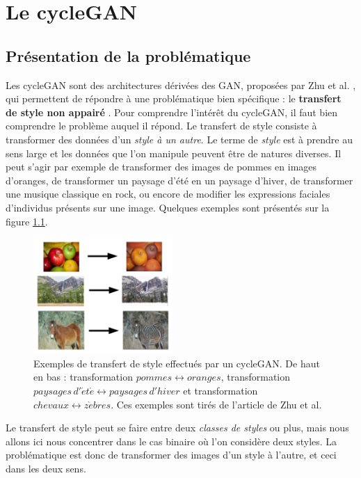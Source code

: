 \chapter{Le cycleGAN}

\section{Présentation de la problématique}


Les cycleGAN sont des architectures dérivées des GAN, proposées par Zhu et al. \cite{zhu_unpaired_2018}, qui permettent de répondre à une problématique bien spécifique : le \textbf{transfert de style non appairé} \cite{gatys_image_2016}. Pour comprendre l’intérêt du cycleGAN, il faut bien comprendre le problème auquel il répond.
Le transfert de style consiste à transformer des données d'un \textit{style à un autre}. Le terme de \textit{style} est à prendre au sens large et les données que l'on manipule peuvent être de natures diverses. Il peut s'agir par exemple de transformer des images de pommes en images d'oranges, de transformer un paysage d'été en un paysage d'hiver, de transformer une musique classique en rock, ou encore de modifier les expressions faciales d'individus présents sur une image. Quelques exemples sont présentés sur la figure \ref{cycle_exemples}.

\begin{figure}[!h]
\centering
\includegraphics[width=150pt,valign=t]{"images/cycle_exemples"}
\caption{Exemples de transfert de style effectués par un cycleGAN. De haut en bas : transformation $pommes \leftrightarrow oranges$, transformation $paysages \, d'\acute{e} t \acute{e} \leftrightarrow paysages\,d'hiver$ et transformation $chevaux \leftrightarrow z\grave{e}bres$. Ces exemples sont tirés de l'article de Zhu et al. \cite{zhu_unpaired_2018}}
\label{cycle_exemples}
\end{figure}


Le transfert de style peut se faire entre deux \textit{classes de styles} ou plus, mais nous allons ici nous concentrer dans le cas binaire où l'on considère deux styles. La problématique est donc de transformer des images d'un style à l'autre, et ceci dans les deux sens.

